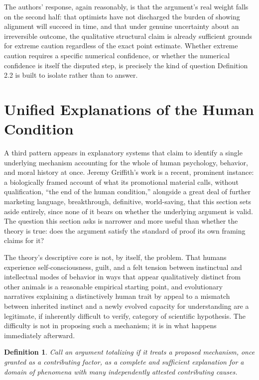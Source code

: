 \documentclass[11pt]{book}
\newtheorem{definition}[theorem]{Definition}
\begin{document}
The authors' response, again reasonably, is that the argument's real weight falls on the second half: that optimists have not discharged the burden of showing alignment will succeed in time, and that under genuine uncertainty about an irreversible outcome, the qualitative structural claim is already sufficient grounds for extreme caution regardless of the exact point estimate. Whether extreme caution requires a specific numerical confidence, or whether the numerical confidence is itself the disputed step, is precisely the kind of question Definition 2.2 is built to isolate rather than to answer.

\section{Unified Explanations of the Human Condition}

A third pattern appears in explanatory systems that claim to identify a single underlying mechanism accounting for the whole of human psychology, behavior, and moral history at once. Jeremy Griffith's work is a recent, prominent instance: a biologically framed account of what its promotional material calls, without qualification, ``the end of the human condition,'' alongside a great deal of further marketing language, breakthrough, definitive, world-saving, that this section sets aside entirely, since none of it bears on whether the underlying argument is valid. The question this section asks is narrower and more useful than whether the theory is true: does the argument satisfy the standard of proof its own framing claims for it?

The theory's descriptive core is not, by itself, the problem. That humans experience self-consciousness, guilt, and a felt tension between instinctual and intellectual modes of behavior in ways that appear qualitatively distinct from other animals is a reasonable empirical starting point, and evolutionary narratives explaining a distinctively human trait by appeal to a mismatch between inherited instinct and a newly evolved capacity for understanding are a legitimate, if inherently difficult to verify, category of scientific hypothesis. The difficulty is not in proposing such a mechanism; it is in what happens immediately afterward.

\begin{definition}
Call an argument \emph{totalizing} if it treats a proposed mechanism, once granted as a contributing factor, as a complete and sufficient explanation for a domain of phenomena with many independently attested contributing causes.
\end{definition}
\end{document}
